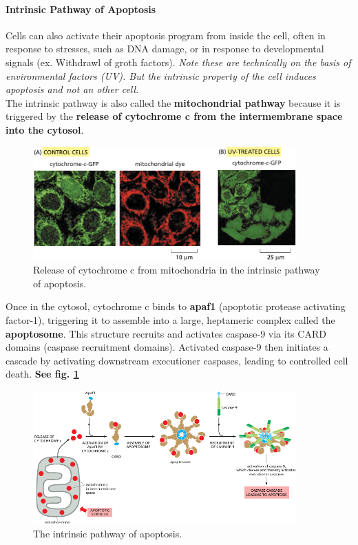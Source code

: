 \documentclass[../main.tex]{subfiles}
\begin{document}
\paragraph{Intrinsic Pathway of Apoptosis}
Cells can also activate their apoptosis program from inside the cell, often in response to stresses, such as DNA damage, or in response to developmental signals (ex. Withdrawl of groth factors). \textit{Note these are technically on the basis of environmental factors (UV). But the intrinsic property of the cell induces apoptosis and not an other cell.}\\
\indent The intrinsic pathway is also called the \textbf{mitochondrial pathway} because it is triggered by the\textbf{ release of cytochrome c from the intermembrane space into the cytosol}.
\begin{figure}[H]
	\centering
	\includegraphics[width = 0.9\textwidth]{9}
	\caption{Release of cytochrome c from mitochondria in the intrinsic pathway of apoptosis.}
\end{figure}

Once in the cytosol, cytochrome c binds to \textbf{\gls{apaf1}} (apoptotic protease activating factor-1), triggering it to assemble into a large, heptameric complex called the \textbf{\gls{apoptosome}}. This structure recruits and activates caspase-9 via its CARD domains (caspase recruitment domains). Activated caspase-9 then initiates a cascade by activating downstream executioner caspases, leading to controlled cell death. \textbf{See fig. \ref{intrinsic-pathway}}

\begin{figure}[H]
	\centering
	\includegraphics[width = 0.9\textwidth]{8}
	\caption{The intrinsic pathway of apoptosis.}
	\label{intrinsic-pathway}
\end{figure}
\end{document}
